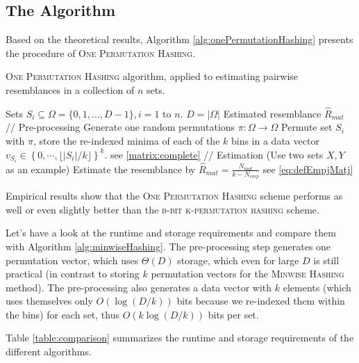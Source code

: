 \documentclass[a4paper]{article}
\begin{document}
\subsection{The Algorithm}

Based on the theoretical results, Algorithm \vref{alg:onePermutationHashing} presents the procedure of \textsc{One Permutation Hashing}.

\begin{algorithm}[H]
\caption{\textsc{One Permutation Hashing} algorithm, applied to estimating pairwise resemblances in a collection of $n$ sets.}
\label{alg:onePermutationHashing}
\begin{algorithmic}
\Require Sets $S_i \subseteq \Omega = \{0,1,\ldots,D-1\}, i = 1 \text{ to } n$. \Comment $D = \left| \Omega \right|$
\Ensure Estimated resemblance $\hat{R}_{mat}$
\State // Pre-processing
\State Generate one random permutations $\pi: \Omega\longrightarrow\Omega$
	\State Permute set $S_i$ with $\pi$, store the re-indexed minima of each of the $k$ bins in a data vector $v_{S_i} \in \left\lbrace 0,\cdots,\lfloor \left| S_i \right| / k \rfloor \right\rbrace ^k$. \Comment see \ref{matrix:complete}
\EndFor
\State
\State // Estimation (Use two sets $X,Y$ as an example)
\State Estimate the resemblance by $\hat{R}_{mat}=\frac{N_{mat}}{k-N_{emp}}$ \Comment see \ref{eq:defEmpjMatj}
\end{algorithmic}
\end{algorithm}

Empirical results show that the \textsc{One Permutation Hashing} scheme performs as well or even slightly better than the \textsc{b-bit k-permutation hashing} scheme.

Let's have a look at the runtime and storage requirements and compare them with Algorithm \vref{alg:minwiseHashing}. The pre-processing step generates one permutation vector, which uses $\Theta(D)$ storage, which even for large $D$ is still practical (in contrast to storing $k$ permutation vectors for the \textsc{Minwise Hashing} method). The pre-processing also generates a data vector with $k$ elements (which uses themselves only $O(\log(D/k))$ bits because we re-indexed them within the bins) for each set, thus $O(k \log(D/k))$ bits per set.

Table \vref{table:comparison} summarizes the runtime and storage requirements of the different algorithms.
\end{document}
